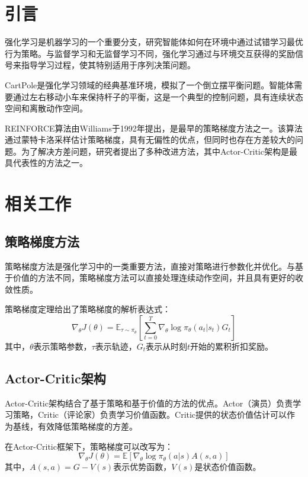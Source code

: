 \documentclass[12pt,a4paper]{article}
\begin{document}
\newpage

\section{引言}

强化学习是机器学习的一个重要分支，研究智能体如何在环境中通过试错学习最优行为策略。与监督学习和无监督学习不同，强化学习通过与环境交互获得的奖励信号来指导学习过程，使其特别适用于序列决策问题。

CartPole是强化学习领域的经典基准环境，模拟了一个倒立摆平衡问题。智能体需要通过左右移动小车来保持杆子的平衡，这是一个典型的控制问题，具有连续状态空间和离散动作空间。

REINFORCE算法由Williams于1992年提出，是最早的策略梯度方法之一。该算法通过蒙特卡洛采样估计策略梯度，具有无偏性的优点，但同时也存在方差较大的问题。为了解决方差问题，研究者提出了多种改进方法，其中Actor-Critic架构是最具代表性的方法之一。

\section{相关工作}

\subsection{策略梯度方法}

策略梯度方法是强化学习中的一类重要方法，直接对策略进行参数化并优化。与基于价值的方法不同，策略梯度方法可以直接处理连续动作空间，并且具有更好的收敛性质。

策略梯度定理给出了策略梯度的解析表达式：
\begin{equation}
\nabla_\theta J(\theta) = \mathbb{E}_{\tau \sim \pi_\theta}\left[\sum_{t=0}^{T} \nabla_\theta \log \pi_\theta(a_t|s_t) G_t\right]
\end{equation}
其中，$\theta$表示策略参数，$\tau$表示轨迹，$G_t$表示从时刻$t$开始的累积折扣奖励。

\subsection{Actor-Critic架构}

Actor-Critic架构结合了基于策略和基于价值的方法的优点。Actor（演员）负责学习策略，Critic（评论家）负责学习价值函数。Critic提供的状态价值估计可以作为基线，有效降低策略梯度的方差。

在Actor-Critic框架下，策略梯度可以改写为：
\begin{equation}
\nabla_\theta J(\theta) = \mathbb{E}\left[\nabla_\theta \log \pi_\theta(a|s) A(s,a)\right]
\end{equation}
其中，$A(s,a) = G - V(s)$表示优势函数，$V(s)$是状态价值函数。
\end{document}
